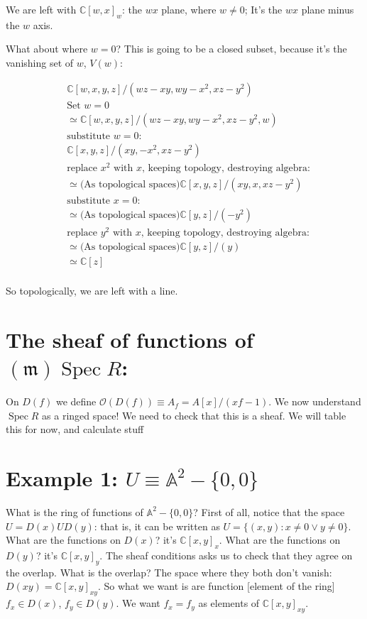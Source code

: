 \documentclass{book}
\newcommand{\C}{\ensuremath{\mathbb{C}}}
\newcommand{\A}{\ensuremath{\mathbb{A}}}
\renewcommand{\O}{\ensuremath{\mathcal{O}}}
\newcommand{\Spec}{\operatorname{Spec}}
\newcommand{\m}{\mathfrak{m}}
\theoremstyle{definition}
\begin{document}
We are left with $\C[w, x]_w$: the $wx$ plane, where $w \neq 0$;
It's the $wx$ plane minus the $w$ axis.

What about where $w = 0$? This is going to be a closed subset, because it's
the vanishing set of $w$, $V(w)$:

\begin{align*}
&\C[w, x, y, z]/(wz - xy, wy - x^2, xz - y^2) \\
&\text{Set $w = 0$} \\
&\simeq \C[w, x, y, z]/(wz - xy, wy - x^2, xz - y^2, w) \\
&\text{substitute $w = 0:$} \\
&\C[x, y, z]/(xy, - x^2, xz - y^2) \\
&\text{replace $x^2$ with $x$, keeping topology, destroying algebra:} \\
&\simeq \text{(As topological spaces)} \C[x, y, z]/(xy, x, xz - y^2) \\
&\text{substitute $x = 0:$} \\
&\simeq \text{(As topological spaces)} \C[y, z]/(- y^2) \\
&\text{replace $y^2$ with $x$, keeping topology, destroying algebra:} \\
&\simeq \text{(As topological spaces)} \C[y, z]/(y) \\
&\simeq \C[z] \\
\end{align*}

So topologically, we are left with a line.

\section{The sheaf of functions of $(\m)\Spec R$:}
On $D(f)$ we define $\O(D(f)) \equiv A_f = A[x]/(xf - 1)$.
We now understand $\Spec R$ as a ringed space!
We need to check that this is a sheaf. 
We will table this for now, and calculate stuff

\section{Example 1: $U \equiv \A^2-\{0, 0\}$}

What is the ring of functions of $\A^2 - \{0, 0 \}$? First of all, notice
that the space $U = D(x) U D(y)$: that is, it can be written as $U = \{ (x, y) : x \neq 0 \lor y \neq 0 \}$.
What are the functions on $D(x)$? it's $\C[x, y]_x$. What are the
functions on $D(y)$? it's $\C[x, y]_y$. The sheaf conditions
asks us to check that they agree on the overlap. What is the overlap?
The space where they both don't vanish: $D(xy) = \C[x, y]_{xy}$. So
what we want is are function [element of the ring]
$f_x \in D(x)$, $f_y \in D(y)$. We want $f_x = f_y$ as elements of
$\C[x, y]_{xy}$.
\end{document}

